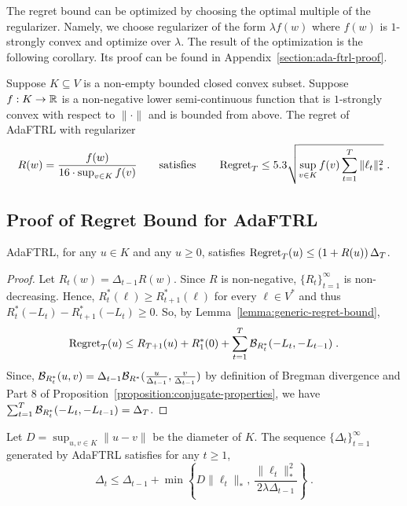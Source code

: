 The regret bound can be optimized by choosing the optimal multiple of the
regularizer.  Namely, we choose regularizer of the form $\lambda f(w)$ where
$f(w)$ is $1$-strongly convex and optimize over $\lambda$. The result of the
optimization is the following corollary.  Its proof can be found in
Appendix~\ref{section:ada-ftrl-proof}.

\begin{corollary}
\label{corollary:ada-ftrl-regret-bound}
Suppose $K \subseteq V$ is a non-empty bounded closed convex subset. Suppose
$f:K \to \mathbb{R}$ is a non-negative lower semi-continuous function that is
$1$-strongly convex with respect to $\|\cdot\|$ and is bounded from above.  The
regret of AdaFTRL with regularizer
$$
R(w) = \frac{f(w)}{16 \cdot \sup_{v \in K} f(v)}
\qquad \text{satisfies} \qquad
\operatorname{Regret}_T \le
5.3 \sqrt{\sup_{v \in K} f(v) \sum_{t=1}^T \|\ell_t\|_*^2} \; .
$$
\end{corollary}

\subsection{Proof of Regret Bound for AdaFTRL}
\label{section:ada-ftrl-regret-bound}

\begin{lemma}
\label{lemma:initial-regret-bound}
AdaFTRL, for any $u \in K$ and any $u \ge 0$, satisfies
$\operatorname{Regret}_T(u) \le \left(1 + R(u) \right) \Delta_T$.
\end{lemma}

\begin{proof}
Let $R_t(w) = \Delta_{t-1} R(w)$. Since $R$ is non-negative,
$\{R_t\}_{t=1}^\infty$ is non-decreasing.  Hence, $R_t^*(\ell) \ge
R_{t+1}^*(\ell)$ for every $\ell \in V^*$ and thus $R_t^*(-L_t) -
R_{t+1}^*(-L_t) \ge 0$.  So, by Lemma~\ref{lemma:generic-regret-bound},
\begin{equation}
\label{equation:regret-bound-inequality}
\operatorname{Regret}_T(u) \le R_{T+1}(u) + R_1^*(0) + \sum_{t=1}^{T} \mathcal{B}_{R_t^*}(-L_t, -L_{t-1}) \; .
\end{equation}
Since, $\mathcal{B}_{R_t^*}(u,v) = \Delta_{t-1} \mathcal{B}_{R^*}(\frac{u}{\Delta_{t-1}},
\frac{v}{\Delta_{t-1}})$ by definition of Bregman divergence and Part 8 of
Proposition~\ref{proposition:conjugate-properties}, we have $\sum_{t=1}^T
\mathcal{B}_{R_t^*}(-L_t, -L_{t-1}) = \Delta_T$.
\end{proof}

\begin{lemma}[Recurrence]
\label{lemma:gap-recurrence}
Let $D = \sup_{u, v \in K} \|u -v\|$ be the diameter of $K$.
The sequence $\{\Delta_t\}_{t=1}^\infty$ generated by AdaFTRL satisfies for any $t \ge 1$,
$$
\Delta_t \le \Delta_{t-1} + \min \left\{ D\|\ell_t\|_*, \ \frac{\|\ell_t\|_*^2}{2\lambda \Delta_{t-1}} \right\} \; .
$$
\end{lemma}

